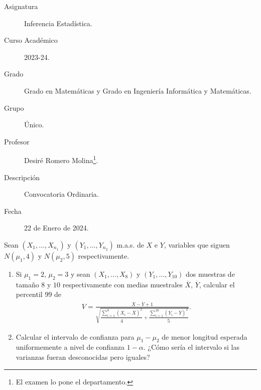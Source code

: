 \documentclass[12pt]{article}
\begin{document}

    
    

    \begin{description}
        \item[Asignatura] Inferencia Estadística.
        \item[Curso Académico] 2023-24.
        \item[Grado] Grado en Matemáticas y Grado en Ingeniería Informática y Matemáticas.
        \item[Grupo] Único.
        \item[Profesor] Desiré Romero Molina\footnote{El examen lo pone el departamento.}.
        \item[Descripción] Convocatoria Ordinaria.
        \item[Fecha] 22 de Enero de 2024.  
    \end{description}
    \newpage



    \begin{ejercicio}
        Sean $(X_1,\dots,X_{n_1})$ y $(Y_1,\dots,Y_{n_2})$ m.a.s. de $X$ e $Y$, variables que siguen
        $N(\mu_1,4)$ y $N(\mu_2,5)$ respectivamente.

        \begin{enumerate}
            \item[a)] Si $\mu_1=2$, $\mu_2=3$ y sean $(X_1,\dots,X_8)$ y $(Y_1,\dots,Y_{10})$ dos muestras
            de tamaño $8$ y $10$ respectivamente con medias muestrales $\overline X$, $\overline Y$,
            calcular el percentil $99$ de
            \begin{gather}
                V=\frac{\overline X-\overline Y+1}
                {\sqrt{\dfrac{\displaystyle\sum_{i=1}^8 (X_i-\overline X)^2}{4}
                +\dfrac{\displaystyle\sum_{i=1}^{10}(Y_i-\overline Y)^2}{5}}}.
            \end{gather}

            \item[b)] Calcular el intervalo de confianza para $\mu_1-\mu_2$ de menor longitud esperada
            uniformemente a nivel de confianza $1-\alpha$. ¿Cómo sería el intervalo si las varianzas 
            fueran desconocidas pero iguales?
        \end{enumerate}
    \end{ejercicio}
\end{document}

